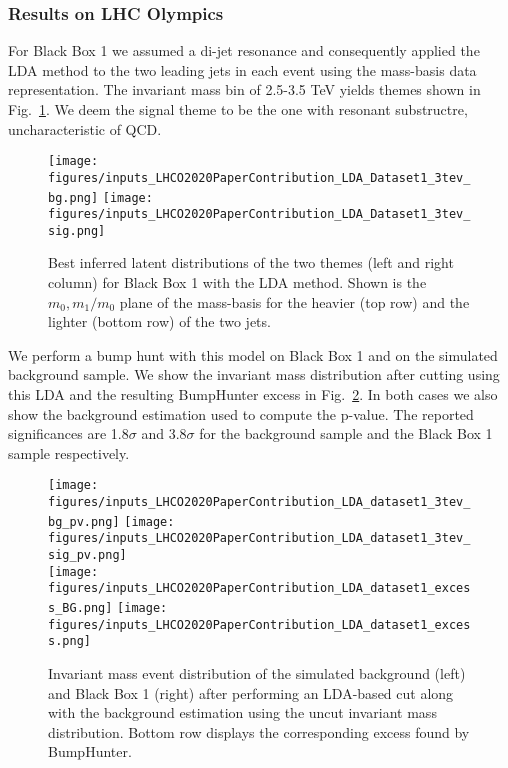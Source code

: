 \documentclass[a4paper,11pt]{article}
\begin{document}
\subsubsection{Results on LHC Olympics}
\label{sec:results}

For Black Box 1 we assumed a di-jet resonance and consequently applied the LDA method to the two leading jets in each event using the mass-basis data representation. 
The invariant mass bin of 2.5-3.5 TeV yields themes shown in Fig.~\ref{fig:fig2}. We deem the signal theme to be the one with resonant substructre, uncharacteristic of QCD. 
\begin{figure}[h]
\begin{center}
\texttt{[image: figures/inputs\_LHCO2020PaperContribution\_LDA\_Dataset1\_3tev\_bg.png]}
\texttt{[image: figures/inputs\_LHCO2020PaperContribution\_LDA\_Dataset1\_3tev\_sig.png]}
\caption{ Best inferred latent distributions of the two themes (left and right column) for Black Box 1 with the LDA method. Shown is the $m_0, m_1/m_0$ plane of the mass-basis for the heavier (top row) and the lighter (bottom row) of the two jets.  \label{fig:fig2}}
\end{center}
\end{figure}
We perform a bump hunt with this model on Black Box 1 and on the simulated background sample. We show the invariant mass distribution after cutting using this LDA and the resulting BumpHunter excess in Fig.~\ref{fig:fig3}. In both cases we also show the background estimation used to compute the p-value. The reported significances are 1.8$\sigma$ and 3.8$\sigma$ for the background sample and the Black Box 1 sample respectively.
\begin{figure}[h]
\begin{center}
\texttt{[image: figures/inputs\_LHCO2020PaperContribution\_LDA\_dataset1\_3tev\_bg\_pv.png]}
\texttt{[image: figures/inputs\_LHCO2020PaperContribution\_LDA\_dataset1\_3tev\_sig\_pv.png]}\\
\texttt{[image: figures/inputs\_LHCO2020PaperContribution\_LDA\_dataset1\_excess\_BG.png]}
\texttt{[image: figures/inputs\_LHCO2020PaperContribution\_LDA\_dataset1\_excess.png]}
\caption{ Invariant mass event distribution of the simulated background (left) and Black Box 1 (right) after performing an LDA-based cut along with the background estimation using the uncut invariant mass distribution. Bottom row displays the corresponding excess found by BumpHunter.
 \label{fig:fig3}}
\end{center}
\end{figure}
\end{document}
